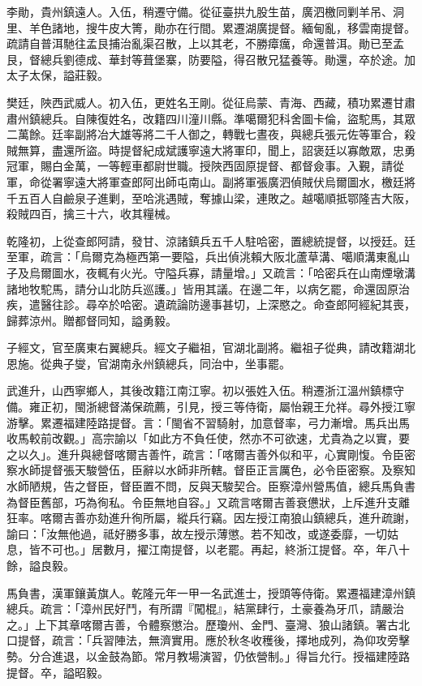 \begin{pinyinscope}
李勛，貴州鎮遠人。入伍，稍遷守備。從征臺拱九股生苗，廣泗檄同剿羊吊、洞里、羊色諸地，搜牛皮大箐，勛亦在行間。累遷湖廣提督。緬甸亂，移雲南提督。疏請自普洱馳往孟艮捕治亂渠召散，上以其老，不勝瘴癘，命還普洱。勛已至孟艮，督總兵劉德成、華封等葺堡寨，防要隘，得召散兄猛養等。勛還，卒於途。加太子太保，謚莊毅。

樊廷，陜西武威人。初入伍，更姓名王剛。從征烏蒙、青海、西藏，積功累遷甘肅肅州鎮總兵。自陳復姓名，改籍四川潼川縣。準噶爾犯科舍圖卡倫，盜駝馬，其眾二萬餘。廷率副將冶大雄等將二千人御之，轉戰七晝夜，與總兵張元佐等軍合，殺賊無算，盡還所盜。時提督紀成斌護寧遠大將軍印，聞上，詔褒廷以寡敵眾，忠勇冠軍，賜白金萬，一等輕車都尉世職。授陜西固原提督、都督僉事。入覲，請從軍，命從署寧遠大將軍查郎阿出師屯南山。副將軍張廣泗偵賊伏烏爾圖水，檄廷將千五百人自鹼泉子進剿，至哈洮遇賊，奪據山梁，連敗之。越噶順抵鄂隆吉大阪，殺賊四百，擒三十六，收其糧械。

乾隆初，上從查郎阿請，發甘、涼諸鎮兵五千人駐哈密，置總統提督，以授廷。廷至軍，疏言：「烏爾克為極西第一要隘，兵出偵洮賴大阪北蘆草溝、噶順溝東亂山子及烏爾圖水，夜輒有火光。守隘兵寡，請量增。」又疏言：「哈密兵在山南煙墩溝諸地牧駝馬，請分山北防兵巡護。」皆用其議。在邊二年，以病乞罷，命還固原治疾，遣醫往診。尋卒於哈密。遺疏論防邊事甚切，上深愍之。命查郎阿經紀其喪，歸葬涼州。贈都督同知，謚勇毅。

子經文，官至廣東右翼總兵。經文子繼祖，官湖北副將。繼祖子從典，請改籍湖北恩施。從典子燮，官湖南永州鎮總兵，同治中，坐事罷。

武進升，山西寧鄉人，其後改籍江南江寧。初以張姓入伍。稍遷浙江溫州鎮標守備。雍正初，閩浙總督滿保疏薦，引見，授三等侍衛，屬怡親王允祥。尋外授江寧游擊。累遷福建陸路提督。言：「閩省不習騎射，加意督率，弓力漸增。馬兵出馬收馬較前改觀。」高宗諭以「如此方不負任使，然亦不可欲速，尤貴為之以實，要之以久」。進升與總督喀爾吉善忤，疏言：「喀爾吉善外似和平，心實剛愎。令臣密察水師提督張天駿營伍，臣辭以水師非所轄。督臣正言厲色，必令臣密察。及察知水師陋規，告之督臣，督臣置不問，反與天駿契合。臣察漳州營馬值，總兵馬負書為督臣舊部，巧為徇私。令臣無地自容。」又疏言喀爾吉善衰憊狀，上斥進升支離狂率。喀爾吉善亦劾進升徇所屬，縱兵行竊。因左授江南狼山鎮總兵，進升疏謝，諭曰：「汝無他過，祗好勝多事，故左授示薄懲。若不知改，或遂委靡，一切姑息，皆不可也。」居數月，擢江南提督，以老罷。再起，終浙江提督。卒，年八十餘，謚良毅。

馬負書，漢軍鑲黃旗人。乾隆元年一甲一名武進士，授頭等侍衛。累遷福建漳州鎮總兵。疏言：「漳州民好鬥，有所謂『闖棍』，結黨肆行，土豪養為牙爪，請嚴治之。」上下其章喀爾吉善，令體察懲治。歷瓊州、金門、臺灣、狼山諸鎮。署古北口提督，疏言：「兵習陣法，無濟實用。應於秋冬收穫後，擇地成列，為仰攻旁擊勢。分合進退，以金鼓為節。常月教場演習，仍依營制。」得旨允行。授福建陸路提督。卒，謚昭毅。


\end{pinyinscope}
